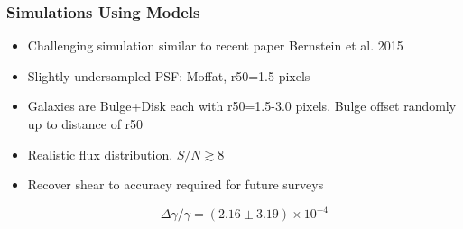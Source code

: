 \documentclass{beamer}
\begin{document}
\frame
{
    \frametitle{Simulations Using Models}

 
    \begin{itemize}

        \item Challenging simulation similar to recent paper Bernstein et al. 2015

        \item Slightly undersampled PSF: Moffat, r50=1.5 pixels

        \item Galaxies are Bulge+Disk each with r50=1.5-3.0 pixels.  Bulge
            offset randomly up to distance of r50

        \item Realistic flux distribution.  $S/N \gtrsim 8$

        \item Recover shear to accuracy required for future surveys

            {\color{gold}
                \begin{equation}
                    \Delta \gamma/\gamma = (2.16 \pm 3.19) \times 10^{-4} \nonumber
                \end{equation}
            }

    \end{itemize}

}
\end{document}
